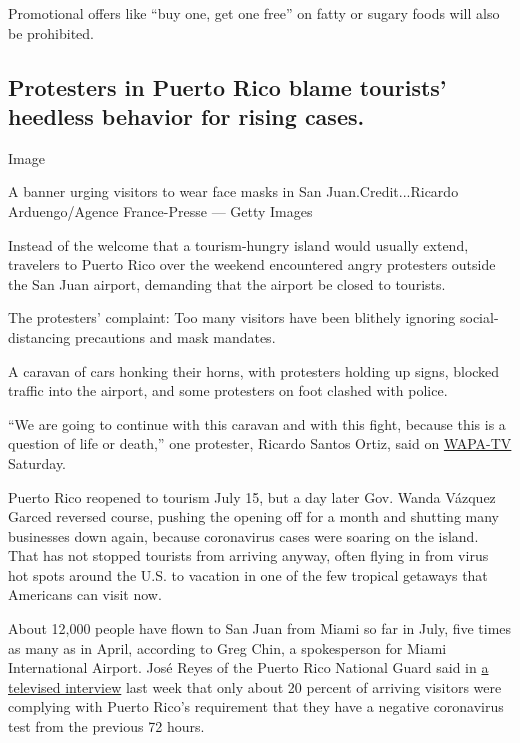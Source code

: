 Promotional offers like ``buy one, get one free'' on fatty or sugary
foods will also be prohibited.

\hypertarget{protesters-in-puerto-rico-blame-tourists-heedless-behavior-for-rising-cases}{%
\subsection{Protesters in Puerto Rico blame tourists' heedless behavior
for rising
cases.}\label{protesters-in-puerto-rico-blame-tourists-heedless-behavior-for-rising-cases}}

Image

A banner urging visitors to wear face masks in San Juan.Credit...Ricardo
Arduengo/Agence France-Presse --- Getty Images

Instead of the welcome that a tourism-hungry island would usually
extend, travelers to Puerto Rico over the weekend encountered angry
protesters outside the San Juan airport, demanding that the airport be
closed to tourists.

The protesters' complaint: Too many visitors have been blithely ignoring
social-distancing precautions and mask mandates.

A caravan of cars honking their horns, with protesters holding up signs,
blocked traffic into the airport, and some protesters on foot clashed
with police.

``We are going to continue with this caravan and with this fight,
because this is a question of life or death,'' one protester, Ricardo
Santos Ortiz, said on
\href{https://www.wapa.tv/noticias/locales/manifestacion-que-exigia-cerrar-aeropuerto-culmina-con-un-arresto_20131122482738.html}{WAPA-TV}
Saturday.

Puerto Rico reopened to tourism July 15, but a day later Gov. Wanda
Vázquez Garced reversed course, pushing the opening off for a month and
shutting many businesses down again, because coronavirus cases were
soaring on the island. That has not stopped tourists from arriving
anyway, often flying in from virus hot spots around the U.S. to vacation
in one of the few tropical getaways that Americans can visit now.

About 12,000 people have flown to San Juan from Miami so far in July,
five times as many as in April, according to Greg Chin, a spokesperson
for Miami International Airport. José Reyes of the Puerto Rico National
Guard said in
\href{https://www.wapa.tv/noticias/locales/alarmante-cantidad-de-viajeros-que-llegan-de-la-florida-a-puerto-rico_20131122482429.html}{a
televised interview} last week that only about 20 percent of arriving
visitors were complying with Puerto Rico's requirement that they have a
negative coronavirus test from the previous 72 hours.

